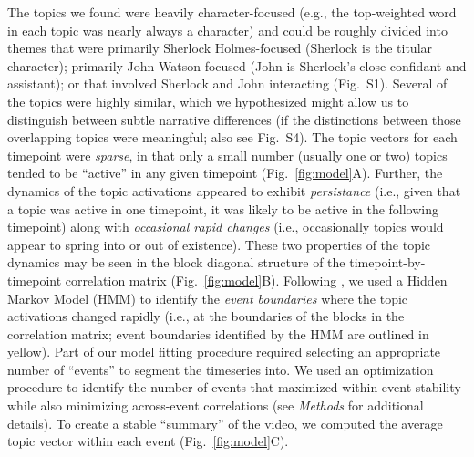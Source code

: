 \documentclass{article}
\newcommand{\topics}{S1}
\newcommand{\featureimportance}{S4}
\begin{document}
The topics we found were heavily character-focused (e.g., the top-weighted word in each topic was nearly always a character) and could be roughly divided into themes that were primarily Sherlock Holmes-focused (Sherlock is the titular character); primarily John Watson-focused (John is Sherlock's close confidant and assistant); or that involved Sherlock and John interacting (Fig.~\topics).  Several of the topics were highly similar, which we hypothesized might allow us to distinguish between subtle narrative differences (if the distinctions between those overlapping topics were meaningful; also see Fig.~\featureimportance).  The topic vectors for each timepoint were \textit{sparse}, in that only a small number (usually one or two) topics tended to be ``active'' in any given timepoint (Fig.~\ref{fig:model}A).  Further, the dynamics of the topic activations appeared to exhibit \textit{persistance} (i.e., given that a topic was active in one timepoint, it was likely to be active in the following timepoint) along with \textit{occasional rapid changes} (i.e., occasionally topics would appear to spring into or out of existence).  These two properties of the topic dynamics may be seen in the block diagonal structure of the timepoint-by-timepoint correlation matrix (Fig.~\ref{fig:model}B).  Following \cite{BaldEtal17}, we used a Hidden Markov Model (HMM) to identify the \textit{event boundaries} where the topic activations changed rapidly (i.e., at the boundaries of the blocks in the correlation matrix; event boundaries identified by the HMM are outlined in yellow).  Part of our model fitting procedure required selecting an appropriate number of ``events'' to segment the timeseries into.  We used an optimization procedure to identify the number of events that maximized within-event stability while also minimizing across-event correlations (see \textit{Methods} for additional details).  To create a stable ``summary'' of the video, we computed the average topic vector within each event (Fig.~\ref{fig:model}C).
\end{document}
